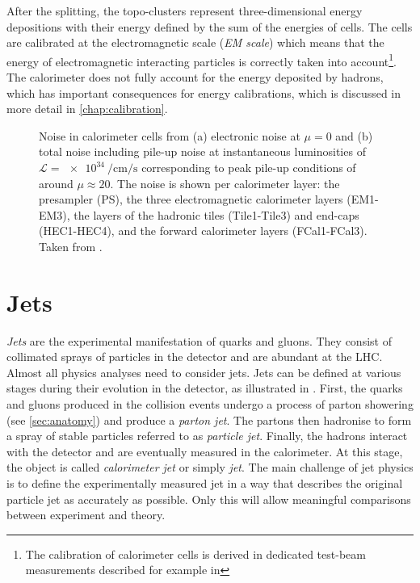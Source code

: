 After the splitting, the topo-clusters represent three-dimensional energy depositions with their energy defined by the sum of the energies of cells.
The cells are calibrated at the electromagnetic scale (\emph{EM scale}) which means that the energy of electromagnetic interacting particles is correctly taken into account\footnote{The calibration of calorimeter cells is derived in dedicated test-beam measurements described for example in }. The calorimeter does not fully account for the energy deposited by hadrons, which has important consequences for energy calibrations, which is discussed in more detail in \cref{chap:calibration}.

\begin{figure}
        
    \caption{Noise in calorimeter cells from (a) electronic noise at $\mu=0$ and (b) total noise including pile-up noise at instantaneous luminosities of $\mathcal{L} = \SI{e34}{\per\cm\per\s}$ corresponding to peak pile-up conditions of around $\mu\approx20$. The noise is shown per calorimeter layer: the presampler (PS), the three electromagnetic calorimeter layers (EM1-EM3), the layers of the hadronic tiles (Tile1-Tile3) and end-caps (HEC1-HEC4), and the forward calorimeter layers (FCal1-FCal3). Taken from .}
    \label{fig:calo-noise}
\end{figure}


\section{Jets}
\emph{Jets} are the experimental manifestation of quarks and gluons.
They consist of collimated sprays of particles in the detector and are abundant at the LHC.
Almost all physics analyses need to consider jets. Jets can be defined at various stages during their evolution in the detector, as illustrated in . First, the quarks and gluons produced in the collision events undergo a process of parton showering (see \cref{sec:anatomy}) and produce a \emph{parton jet}. The partons then hadronise to form a spray of stable particles referred to as \emph{particle jet}. Finally, the hadrons interact with the detector and are eventually measured in the calorimeter. At this stage, the object is called \emph{calorimeter jet} or simply \emph{jet}.
The main challenge of jet physics is to define the experimentally measured jet in a way that describes the original particle jet as accurately as possible.
Only this will allow meaningful comparisons between experiment and theory.

